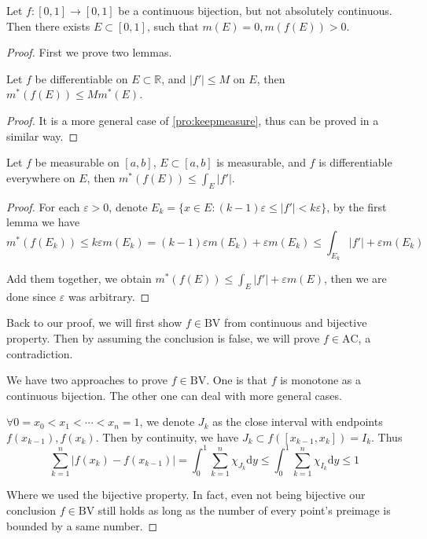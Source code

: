 \begin{problem}
Let $ f\colon[0,1]\to [0,1] $ be a continuous bijection, but not absolutely continuous. Then there exists $ E\subset [0,1] $, such that $ m(E)=0,m(f(E))>0 $.
\end{problem}

\begin{proof}
	First we prove two lemmas.
	\begin{lemma*}
		Let $ f $ be differentiable on $ E\subset \mathbb{R}  $, and $ |f'|\le M $ on $ E $, then $ m^{*}(f(E))\le Mm^{*}(E) $.
	\end{lemma*}
	\begin{proof}
		It is a more general case of \ref{pro:keepmeasure}, thus can be proved in a similar way.
	\end{proof}
	\begin{lemma*}
		Let $ f $ be measurable on $ [a,b] $, $ E\subset [a,b] $ is measurable, and $ f $ is differentiable everywhere on $ E $, then $ m^{*}(f(E))\le \int_{E}|f'| $.
	\end{lemma*}
	\begin{proof}
		For each $ \varepsilon>0 $, denote $ E_{k}=\{x\in E:(k-1)\varepsilon\le |f'|<k\varepsilon\} $, by the first lemma we have
		$$
		m^*( f( E_k ) ) \le k\varepsilon m( E_k ) =( k-1 ) \varepsilon m( E_k ) +\varepsilon m( E_k ) \le \int_{E_k}^{}{|f'|}+\varepsilon m( E_k ) 
		$$
		
		Add them together, we obtain $
		m^*( f( E ) ) \le \int_E^{}{|f'|}+\varepsilon m( E ) 
		$, then we are done since $ \varepsilon $ was arbitrary.
	\end{proof}
	
	Back to our proof, we will first show $ f\in \mathrm {BV} $ from continuous and bijective property. Then by assuming the conclusion is false, we will prove $ f\in\mathrm{AC} $, a contradiction.
	
	We have two approaches to prove $ f\in \mathrm{BV}  $. One is that $ f $ is monotone as a continuous bijection. The other one can deal with more general cases.
	
	$
	\forall 0=x_0<x_1<\cdots <x_n=1
	$, we denote $ J_{k} $ as the close interval with endpoints $ f(x_{k-1}),f(x_{k}) $. Then by continuity, we have $
	J_k\subset f( [ x_{k-1},x_k ] ) =I_k
	$. Thus
	$$
	\sum_{k=1}^n{|f( x_k ) -f( x_{k-1} ) |}=\int_0^1{\sum_{k=1}^n{\chi _{J_k}}\mathrm{d} y}\le \int_0^1{\sum_{k=1}^n{\chi _{I_k}}\mathrm{d} y}\le 1
	$$
	
	Where we used the bijective property. In fact, even not being bijective our conclusion $ f\in \mathrm {BV} $ still holds as long as the number of every point's preimage is bounded by a same number. 
	

\end{proof}
